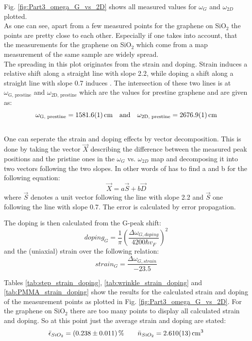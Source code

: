 \documentclass[12pt,a4paper]{article}
\begin{document}
Fig. \ref{fig:Part3_omega_G_vs_2D} shows all measured values for $\omega _G$ and $\omega _{2D}$ plotted. \\
As one can see, apart from a few measured points for the graphene on SiO$_2$ the points are pretty close to each other. Especially if one takes into account, that the measurements for the graphene on SiO$_2$ which come from a map measurement of the same sample are widely spread. \\
The spreading in this plot originates from the strain and doping. Strain induces a relative shift along a straight line with slope 2.2, while doping a shift along a straight line with slope 0.7 induces \cite{NeumannStampfer}. The intersection of these two lines is at $\omega _{\text{G, prestine}}$ and $\omega _{\text{2D, prestine}}$ which are the values for prestine graphene and are given as: 
\begin{equation*}
\omega _{\text{G, prestine}} = \SI{1581.6 \pm 0.1}{\per cm} \quad \text{and} \quad \omega _{\text{2D, prestine}} = \SI{2676.9 \pm 0.1}{\per cm}
\end{equation*} \\

One can seperate the strain and doping effects by vector decomposition. This is done by taking the vector $\vec{X}$ describing the difference between the measured peak positions and the pristine ones in the $\omega _G$ vs. $\omega _{2D}$ map and decomposing it into two vectors following the two slopes. In other words of has to find a and b for the following equation:
\begin{equation}
\vec{X} = a \vec{S} + b \vec{D}
\end{equation}
where $\vec{S}$ denotes a unit vector following the line with slope 2.2 and $\vec{S}$ one following the line with slope 0.7. The error is calculated by error propagation.

The doping is then calculated from the G-peak shift:
\begin{equation}
  doping_{G} = \dfrac{1}{\pi}\left(\dfrac{\Delta\omega_{G,doping}}{4200\hbar v_F }\right)^2
\end{equation}
and the (uniaxial) strain over the following relation:
\begin{equation}
  strain_{G} = \dfrac{\Delta\omega_{G,strain}}{-23.5}
\end{equation}

Tables \ref{tab:step_strain_doping}, \ref{tab:wrinkle_strain_doping} and \ref{tab:PMMA_strain_doping} show the results for the calculated strain and doping of the measurement points as plotted in Fig. \ref{fig:Part3_omega_G_vs_2D}.  For the graphene on SiO$_2$ there are too many points to display all calculated strain and doping. So at this point just the average strain and doping are stated:
\begin{equation*}
\bar{\epsilon} _{SiO_2} = (0.238 \pm 0.011) \, \% \qquad \bar{n} _{SiO_2} = \SI{2.610 \pm 0.013}{\per c \cubic m}
\end{equation*}
\end{document}
